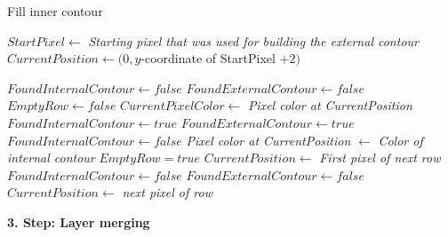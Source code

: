 \documentclass[thesis.tex]{subfiles}
\begin{document}
 \begin{algorithm}
   \caption{Fill inner contour}
\label{scan_pseudocode}
    \begin{algorithmic}[1]
      \State ${StartPixel\gets}$ \textit{Starting pixel that was used for building the external contour}
        \State ${CurrentPosition\gets} (0, y$-coordinate of StartPixel $+ 2)$

\State ${FoundInternalContour\gets false}$
\State ${FoundExternalContour\gets false}$
\State ${EmptyRow\gets false}$
\State
\State ${CurrentPixelColor \gets }$ \textit{Pixel color at CurrentPosition}
\State
					\State ${FoundInternalContour\gets true}$
				\State ${FoundExternalContour\gets true}$
				\State ${FoundInternalContour\gets false}$
				\Else
						\State \textit{Pixel color at CurrentPosition} ${\gets}$ \textit{Color of internal contour}
					\EndIf
				\EndIf
\State
			\State ${EmptyRow = true}$
		\Else
			\State ${CurrentPosition \gets}$ \textit{First pixel of next row}
			\State ${FoundInternalContour\gets false}$
			\State ${FoundExternalContour\gets false}$
		\EndIf
		\Else
		\State ${CurrentPosition} \gets$ \textit{next pixel of row}
		\EndIf
        \EndWhile
      


\end{algorithmic}
\end{algorithm}

\textbf{3. Step: Layer merging}
\end{document}

